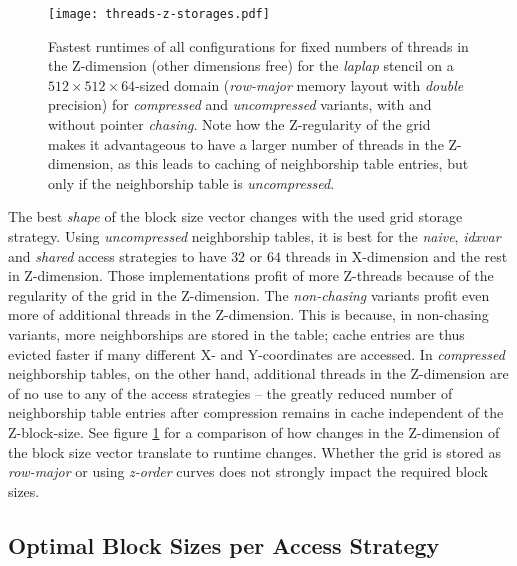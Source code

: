 \begin{figure}
	\begin{center}
    \texttt{[image: threads-z-storages.pdf]}
	\end{center}
    \caption{\label{fig:blocksizes-z}Fastest runtimes of all configurations for fixed numbers of threads in the Z-dimension (other dimensions free) for the \emph{laplap} stencil on a $512\times 512\times 64$-sized domain (\emph{row-major} memory layout with \emph{double} precision) for \emph{compressed} and \emph{uncompressed} variants, with and without pointer \emph{chasing}. Note how the Z-regularity of the grid makes it advantageous to have a larger number of threads in the Z-dimension, as this leads to caching of neighborship table entries, but only if the neighborship table is \emph{uncompressed}.}
\end{figure}

The best \emph{shape} of the block size vector changes with the used grid storage strategy. Using \emph{uncompressed} neighborship tables, it is best for the \emph{naive}, \emph{idxvar} and \emph{shared} access strategies to have $32$ or $64$ threads in X-dimension and the rest in Z-dimension. Those implementations profit of more Z-threads because of the regularity of the grid in the Z-dimension. The \emph{non-chasing} variants profit even more of additional threads in the Z-dimension. This is because, in non-chasing variants, more neighborships are stored in the table; cache entries are thus evicted faster if many different X- and Y-coordinates are accessed. In \emph{compressed} neighborship tables, on the other hand, additional threads in the Z-dimension are of no use to any of the access strategies -- the greatly reduced number of neighborship table entries after compression remains in cache independent of the Z-block-size. See figure \ref{fig:blocksizes-z} for a comparison of how changes in the Z-dimension of the block size vector translate to runtime changes. Whether the grid is stored as \emph{row-major} or using \emph{z-order} curves does not strongly impact the required block sizes.

\subsection{Optimal Block Sizes per Access Strategy}

